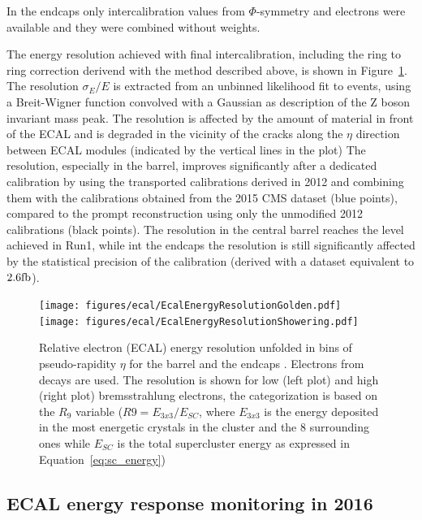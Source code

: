 In the endcaps only intercalibration values from $\Phi$-symmetry and electrons were available and they were combined
without weights.

The energy resolution achieved with final intercalibration, including the ring to ring
correction derivend with the method described above, is shown in Figure~\ref{fig:ecal_res_vs_eta}.
The resolution $\sigma_E/E$ is extracted from an unbinned likelihood fit to \Zee events,
using a Breit-Wigner function convolved with a Gaussian as description of the Z boson invariant mass peak.
The resolution is affected by the amount of material in front of the ECAL and is degraded in the vicinity of
the cracks along the $\eta$ direction between ECAL modules (indicated by the vertical lines in the plot)
The resolution, especially in the barrel, improves significantly after a dedicated calibration by using
the transported calibrations derived in 2012 and combining them with the calibrations obtained
from the 2015 CMS dataset (blue points),
compared to the prompt reconstruction using only the unmodified 2012 calibrations (black points). 
The resolution in the central barrel reaches the level achieved in Run1,
while int the endcaps the resolution is still significantly affected by the statistical precision of the calibration
(derived with a dataset equivalent to $2.6\mathrm{fb}$).

\begin{figure}
  \centering
  \texttt{[image: figures/ecal/EcalEnergyResolutionGolden.pdf]}
  \texttt{[image: figures/ecal/EcalEnergyResolutionShowering.pdf]}
  \caption{Relative electron (ECAL) energy resolution unfolded in bins of pseudo-rapidity $\eta$
    for the barrel and the endcaps \cite{ecal_dpg_2015}. Electrons from \Zee decays are used.
    The resolution is shown for low (left plot) and high (right plot) bremsstrahlung electrons,
    the categorization is based on the $R_9$ variable ($R9=E_{3x3}/E_{SC}$, where $E_{3x3}$ is the energy
    deposited in the most energetic crystals in the cluster and the 8 surrounding ones while $E_{SC}$ is the total
    supercluster energy as expressed in Equation~\ref{eq:sc_energy})}
  \label{fig:ecal_res_vs_eta}
\end{figure}


\subsection{ECAL energy response monitoring in 2016}
